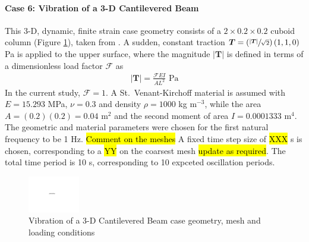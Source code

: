 \documentclass[sn-mathphys,Numbered]{sn-jnl}%
\newcommand{\bb}{\boldsymbol}
\begin{document}
\paragraph{Case 6: Vibration of a 3-D Cantilevered Beam}
This 3-D, dynamic, finite strain case geometry consists of a $2 \times 0.2 \times 0.2$ cuboid column (Figure \ref{fig:dynamic_cantilever}), taken from \citet{Tukovic2007}.
A sudden, constant traction $\bb{T} = \left(\sfrac{|\bb{T}|}{\sqrt{2}}\right) \left(1, 1, 0 \right)$ Pa is applied to the upper surface, where the magnitude $|\bb{T}|$ is defined in terms of a dimensionless load factor $\mathcal{F}$ as
\begin{eqnarray}
	|\bb{T}| = \frac{\mathcal{F} E I}{A L^2} \text{ Pa}
\end{eqnarray}
In the current study, $\mathcal{F} = 1$.
A St.\ Venant-Kirchoff material is assumed with $E = 15.293$ MPa, $\nu = 0.3$ and density $\rho = 1000$ kg m$^{-3}$, while the area $A = (0.2)(0.2) = 0.04$ m$^2$ and the second moment of area $I = 0.0001333$ m$^4$.
The geometric and material parameters were chosen for the first natural frequency to be 1 Hz.
\hl{Comment on the meshes}
A fixed time step size of \hl{XXX} s is chosen, corresponding to a \hl{YY} on the coarsest mesh \hl{update as required}.
The total time period is 10 s, corresponding to 10 expceted oscillation periods.
\begin{figure}[htbp]
   \centering
   \includegraphics[width=0.2\textwidth]{figures/placeholder.pdf} 
   \caption{Vibration of a 3-D Cantilevered Beam case geometry, mesh and loading conditions}
   \label{fig:dynamic_cantilever}
\end{figure}
\end{document}
